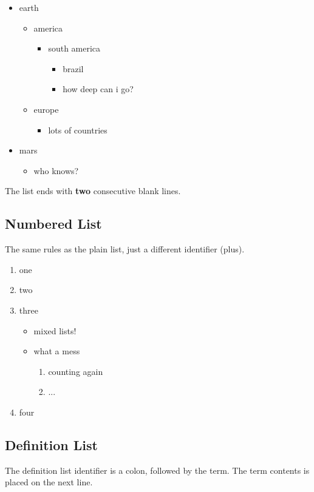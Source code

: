 \documentclass[11pt,a4paper]{article}
\begin{document}
\begin{itemize}
\item earth
  \begin{itemize}
  \item america
    \begin{itemize}
    \item south america
      \begin{itemize}
      \item brazil
      \item how deep can i go?
      \end{itemize}
    \end{itemize}
  \item europe
    \begin{itemize}
    \item lots of countries
    \end{itemize}
  \end{itemize}
\item mars
  \begin{itemize}
  \item who knows?
  \end{itemize}
\end{itemize}

The list ends with \textbf{two} consecutive blank lines.

\subsection*{Numbered List}
The same rules as the plain list, just a different
identifier (plus).

\begin{enumerate}
\item one
\item two
\item three
  \begin{itemize}
  \item mixed lists!
  \item what a mess
    \begin{enumerate}
    \item counting again
    \item ...
    \end{enumerate}
  \end{itemize}
\item four
\end{enumerate}

\subsection*{Definition List}
The definition list identifier is a colon, followed by
the term. The term contents is placed on the next line.
\end{document}
